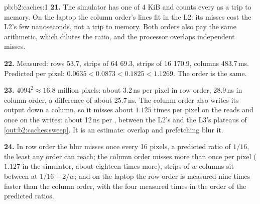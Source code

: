 \begin{solution}{pb:b2:caches:1}
\textbf{21.} The simulator has one  of 4 KiB and counts every  as a trip to memory. On the laptop the column
order's lines fit in the L2: its misses cost the L2's few nanoseconds, not a trip to memory. Both orders also pay the
same arithmetic, which dilutes the ratio, and the processor overlaps independent misses.

\textbf{22.} Measured: rows 53.7, strips of 64 69.3, strips of 16 170.9, columns 483.7\,ms. Predicted per pixel:
$0.0635 < 0.0873 < 0.1825 < 1.1269$. The order is the same.

\textbf{23.} $4094^2 \approx 16.8$ million pixels: about 3.2\,ns per pixel in row order, 28.9\,ns in column order, a
difference of about 25.7\,ns. The column order also writes its output down a column, so it misses about $1.125$ times
per pixel on the reads and once on the writes: about 12\,ns per , between the L2's and the L3's plateaus of
\cref{out:b2:caches:sweep}. It is an estimate: overlap and prefetching blur it.

\textbf{24.} In row order the blur misses once every 16 pixels, a predicted  ratio of $1/16$, the least any order
can reach; the column order misses more than once per pixel ($1.127$ in the simulator, about eighteen times more),
strips of $w$ columns sit between at $1/16 + 2/w$; and on the laptop the row order is measured nine times faster than
the column order, with the four measured times in the order of the predicted  ratios.
\end{solution}
